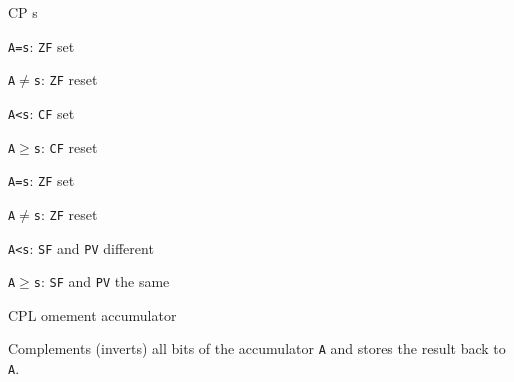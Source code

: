 \begin{basedescript}{
	\desclabelstyle{\multilinelabel}
	\desclabelwidth{3cm}}
\begin{DetailItem}{CP s}
		\begin{multicols}{2}
			\begin{DetailCompactList}[Signed]
				\item {\tt A=s}: {\tt ZF} set
				\item {\tt A$\neq$s}: {\tt ZF} reset
				\item {\tt A<s}: {\tt CF} set
				\item {\tt A$\geqslant$s}: {\tt CF} reset	
			\end{DetailCompactList}

			\columnbreak
			\begin{DetailCompactList}[Unsigned]
				\item {\tt A=s}: {\tt ZF} set
				\item {\tt A$\neq$s}: {\tt ZF} reset
				\item {\tt A<s}: {\tt SF} and {\tt PV} different
				\item {\tt A$\geqslant$s}: {\tt SF} and {\tt PV} the same				
			\end{DetailCompactList}
		\end{multicols}

		\begin{DetailEffects}[v]
			\FlagsCPr
		\end{DetailEffects}
		
		\begin{DetailTiming}
		\end{DetailTiming}

	\end{DetailItem}

	\label{DetailRefCPL}
	\begin{DetailItem}{CPL}
		{omement accumulator}
		{\SymCPL}

		Complements (inverts) all bits of the accumulator {\tt A} and stores the result back to {\tt A}.

		\begin{DetailEffects}
			\FlagsCPL
		\end{DetailEffects}
		
		\begin{DetailTiming}
			\DetailTime{1}{4}
		\end{DetailTiming}


\end{DetailItem}
\end{basedescript}
